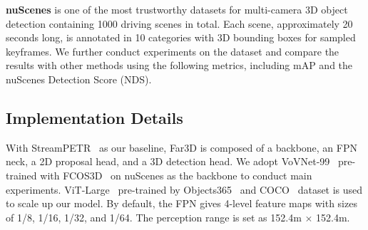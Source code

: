 \documentclass[letterpaper]{article} \usepackage{aaai24}
\begin{document}
\textbf{nuScenes} is one of the most trustworthy datasets for multi-camera 3D object detection containing 1000 driving scenes in total. Each scene, approximately 20 seconds long, is annotated in 10 categories with 3D bounding boxes for sampled keyframes. We further conduct experiments on the dataset and compare the results with other methods using the following metrics, including mAP and the nuScenes Detection Score (NDS).

\begin{table}[t]
    
    \centering
    \caption{Ablation of our components on Argoverse 2 \texttt{val} set. StreamPETR is employed as the baseline, and we add the adaptive query, perspective-aware aggregation (PA) and range-modulated 3D denoising in order.}
    \vspace{-0.2cm}
    \label{tab:ablate_component}
    \tiny
    \vspace{-0.3cm}
\end{table} \subsection{Implementation Details}
With StreamPETR~\cite{wang2023exploring} as our baseline,
Far3D is composed of a backbone, an FPN neck, a 2D proposal head, and a 3D detection head. We adopt VoVNet-99~\cite{lee2019energy} pre-trained with FCOS3D~\cite{wang2021fcos3d} on nuScenes as the backbone to conduct main experiments. ViT-Large~\cite{dosovitskiy2020image} pre-trained by Objects365~\cite{shao2019objects365} and COCO~\cite{lin2014microsoft} dataset is used to scale up our model. By default, the FPN gives 4-level feature maps with sizes of 1/8, 1/16, 1/32, and 1/64. The perception range is set as 152.4m $\times$ 152.4m.
\end{document}
